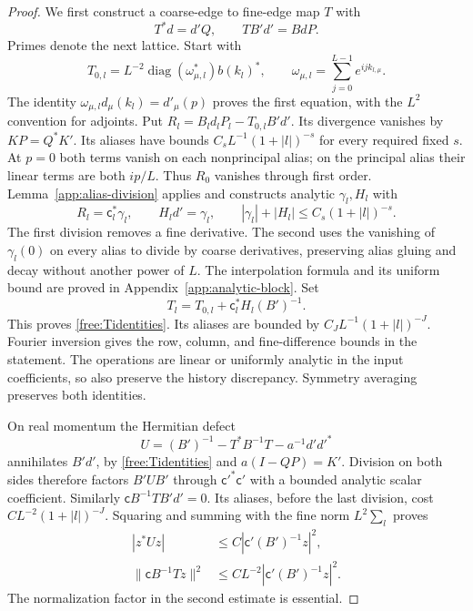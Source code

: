 \begin{proof}
We first construct a coarse-edge to fine-edge map $T$ with
\begin{equation}
\label{free:Tidentities}
 T^*d=d'Q,\qquad TB'd'=BdP.
\end{equation}
Primes denote the next lattice. Start with
\[
 T_{0,l}=L^{-2}\operatorname{diag}(\omega_{\mu,l}^*)b(k_l)^*,\qquad
 \omega_{\mu,l}=\sum_{j=0}^{L-1}e^{ijk_{l,\mu}}.
\]
The identity $\omega_{\mu,l}d_\mu(k_l)=d'_\mu(p)$ proves the first
equation, with the $L^2$ convention for adjoints. Put
$R_l=B_ld_lP_l-T_{0,l}B'd'$. Its divergence vanishes by
$KP=Q^*K'$. Its aliases have bounds
$C_sL^{-1}(1+|l|)^{-s}$ for every required fixed $s$. At $p=0$ both
terms vanish on each nonprincipal alias; on the principal alias their
linear terms are both $ip/L$. Thus $R_0$ vanishes through first order.
Lemma~\ref{app:alias-division} applies and constructs analytic
$\gamma_l,H_l$ with
\[
 R_l=\mathsf c_l^*\gamma_l,\qquad H_ld'=\gamma_l,\qquad
 |\gamma_l|+|H_l|\le C_s(1+|l|)^{-s}.
\]
The first division removes a fine derivative. The second uses the
vanishing of $\gamma_l(0)$ on every alias to divide by coarse
derivatives, preserving alias gluing and decay without another power
of $L$. The interpolation formula and its uniform bound are proved in
Appendix~\ref{app:analytic-block}. Set
\[
 T_l=T_{0,l}+\mathsf c_l^*H_l(B')^{-1}.
\]
This proves \eqref{free:Tidentities}. Its aliases are bounded by
$C_JL^{-1}(1+|l|)^{-J}$. Fourier inversion gives the row, column, and
fine-difference bounds in the statement. The operations are linear or
uniformly analytic in the input coefficients, so also preserve the
history discrepancy. Symmetry averaging preserves both identities.

On real momentum the Hermitian defect
\[
 U=(B')^{-1}-T^*B^{-1}T-a^{-1}d'd'^*
\]
annihilates $B'd'$, by \eqref{free:Tidentities} and $a(I-QP)=K'$.
Division on both sides therefore factors $B'UB'$ through
$\mathsf c'^*\mathsf c'$ with a bounded analytic scalar coefficient.
Similarly $\mathsf c B^{-1}TB'd'=0$. Its aliases, before the last
division, cost $CL^{-2}(1+|l|)^{-J}$. Squaring and summing with the fine
norm $L^2\sum_l$ proves
\begin{align*}
 |z^*Uz|&\le C|\mathsf c'(B')^{-1}z|^2,\\
 \|\mathsf c B^{-1}Tz\|^2&\le CL^{-2}|\mathsf c'(B')^{-1}z|^2.
\end{align*}
The normalization factor in the second estimate is essential.


\end{proof}
